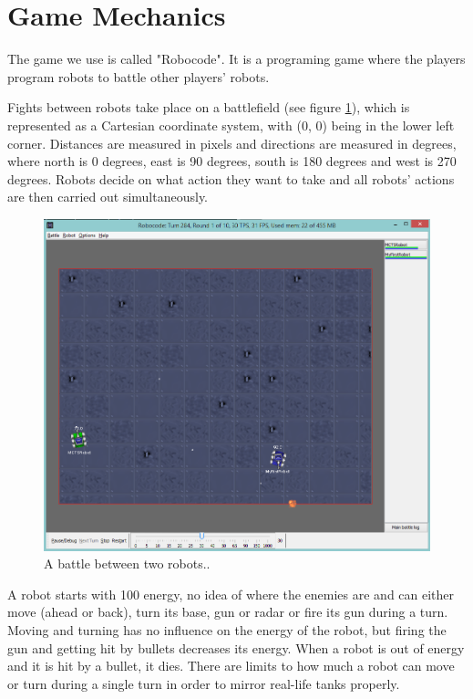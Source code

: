 \section{Game Mechanics}
\label{03}

The game we use is called "Robocode"\cite{robocode}. It is a programing game where the players program robots to battle other players' robots. 

Fights between robots take place on a battlefield (see figure \ref{figure-RobocodeBattle01}), which is represented as a Cartesian coordinate system, with (0, 0) being in the lower left corner. Distances are measured in pixels and directions are measured in degrees, where north is 0 degrees, east is 90 degrees, south is 180 degrees and west is 270 degrees. Robots decide on what action they want to take and all robots' actions are then carried out simultaneously.

\begin{figure}[htp]
\centerline{\includegraphics[width=\columnwidth]{Images/RobocodeBattle01}}
\caption{A battle between two robots..}
\label{figure-RobocodeBattle01}
\end{figure}

A robot starts with 100 energy, no idea of where the enemies are and can either move (ahead or back), turn its base, gun or radar or fire its gun during a turn. Moving and turning has no influence on the energy of the robot, but firing the gun and getting hit by bullets decreases its energy. When a robot is out of energy and it is hit by a bullet, it dies. There are limits to how much a robot can move or turn during a single turn\cite{wiki:robocodeGamePhysics} in order to mirror real-life tanks properly.


